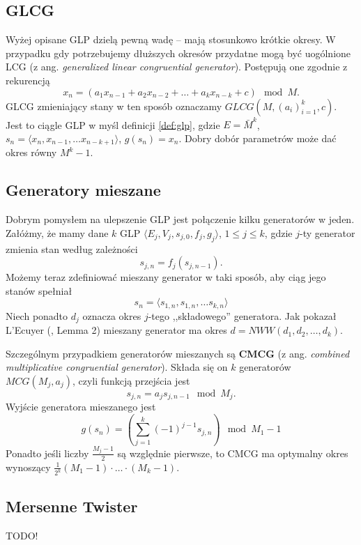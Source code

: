 \documentclass[a4paper,11pt,twoside]{book}
\theoremstyle{definition}
\begin{document}
\subsection*{GLCG}
Wyżej opisane GLP dzielą pewną wadę -- mają stosunkowo krótkie okresy. W przypadku gdy potrzebujemy dłuższych okresów przydatne mogą być uogólnione LCG (z ang. \textit{generalized linear congruential generator}). Postępują one zgodnie z rekurencją
\begin{equation}
 \label{eq:glcg}
 x_n = (a_1 x_{n-1} + a_2 x_{n-2} + \ldots + a_k x_{n-k} + c) \mod M.
\end{equation}
GLCG zmieniający stany w ten sposób oznaczamy $GLCG(M, (a_i)_{i=1}^k, c)$. Jest to ciągle GLP w myśl definicji \ref{def:glp}, gdzie $E = \bar{M}^k$, $s_n = \langle x_n, x_{n-1}, \ldots  x_{n-k+1} \rangle$, $g(s_n) = x_n$. Dobry dobór parametrów może dać okres równy $M^k-1$.

\subsection*{Generatory mieszane}
Dobrym pomysłem na ulepszenie GLP jest połączenie kilku generatorów w jeden. Załóżmy, że mamy dane $k$ GLP $\langle E_j, V_j, s_{j,0}, f_j, g_j \rangle$, $1 \leq j \leq k$, gdzie $j$-ty generator zmienia stan według zależności 
\[ s_{j,n} = f_j(s_{j,n-1}). \]
Możemy teraz zdefiniować mieszany generator w taki sposób, aby ciąg jego stanów spełniał
\[ s_n = \langle s_{1,n}, s_{1,n}, \ldots s_{k,n} \rangle\]
Niech ponadto $d_j$ oznacza okres $j$-tego ,,składowego'' generatora. Jak pokazał L'Ecuyer (\cite{lecuyer}, Lemma 2) mieszany generator ma okres $d = NWW(d_1, d_2,\ldots,d_k)$.

Szczególnym przypadkiem generatorów mieszanych są \textbf{CMCG} (z ang. \textit{combined multiplicative congruential generator}). Składa się on $k$ generatorów $MCG(M_j, a_j)$, czyli funkcją przejścia jest
\[ s_{j,n} = a_j s_{j,n-1} \mod M_j. \]
Wyjście generatora mieszanego jest
\[ g(s_n) = \left( \sum_{j=1}^{k} (-1)^{j-1} s_{j,n} \right) \mod M_1 - 1\]
Ponadto jeśli liczby $\frac{M_j-1}{2}$ są względnie pierwsze, to CMCG ma optymalny okres wynoszący $\frac{1}{2^k}(M_1-1)\cdot \ldots \cdot (M_k-1)$.

\subsection*{Mersenne Twister}
{\bigskip \color{red} \LARGE{TODO!}}
\end{document}
